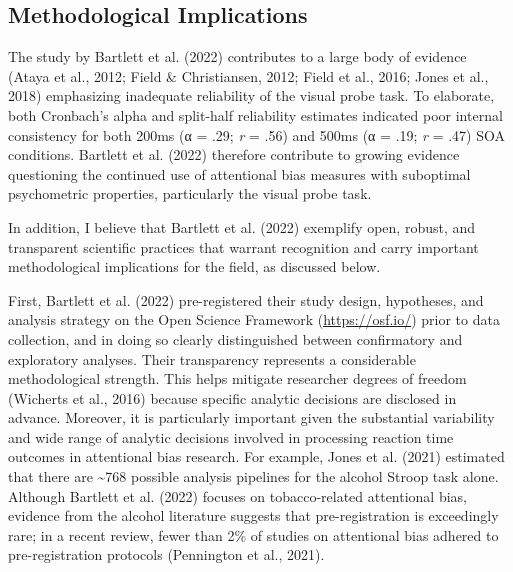 \documentclass[authordate, reflection, issue]{jote-new-article}
\begin{document}
	\subsection{Methodological Implications}



	The study by Bartlett et al. (2022) contributes to a large body of evidence (Ataya et al., 2012; Field \& Christiansen, 2012; Field et al., 2016; Jones et al., 2018) emphasizing inadequate reliability of the visual probe task. To elaborate, both Cronbach's alpha and split-half reliability estimates indicated poor internal consistency for both 200ms (α = .29; \emph{r} = .56) and 500ms (α = .19; \emph{r} = .47) SOA conditions. Bartlett et al. (2022) therefore contribute to growing evidence questioning the continued use of attentional bias measures with suboptimal psychometric properties, particularly the visual probe task.



	In addition, I believe that Bartlett et al. (2022) exemplify open, robust, and transparent scientific practices that warrant recognition and carry important methodological implications for the field, as discussed below.



	First, Bartlett et al. (2022) pre-registered their study design, hypotheses, and analysis strategy on the Open Science Framework (\href{https://osf.io/}{https://osf.io/}) prior to data collection, and in doing so clearly distinguished between confirmatory and exploratory analyses. Their transparency represents a considerable methodological strength. This helps mitigate researcher degrees of freedom (Wicherts et al., 2016) because specific analytic decisions are disclosed in advance. Moreover, it is particularly important given the substantial variability and wide range of analytic decisions involved in processing reaction time outcomes in attentional bias research. For example, Jones et al. (2021) estimated that there are \textasciitilde{}768 possible analysis pipelines for the alcohol Stroop task alone. Although Bartlett et al. (2022) focuses on tobacco-related attentional bias, evidence from the alcohol literature suggests that pre-registration is exceedingly rare; in a recent review, fewer than 2\% of studies on attentional bias adhered to pre-registration protocols (Pennington et al., 2021).
\end{document}

